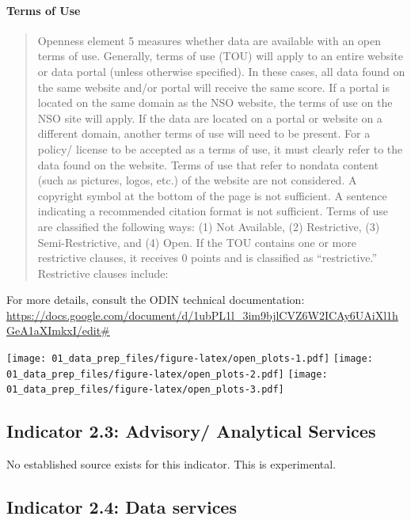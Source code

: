 \documentclass[]{article}
\let\oldparagraph\paragraph
\renewcommand{\paragraph}[1]{\oldparagraph{#1}\mbox{}}
\begin{document}
\hypertarget{terms-of-use}{%
\paragraph{Terms of Use}\label{terms-of-use}}

\begin{quote}
Openness element 5 measures whether data are available with an open
terms of use. Generally, terms of use (TOU) will apply to an entire
website or data portal (unless otherwise specified). In these cases, all
data found on the same website and/or portal will receive the same
score. If a portal is located on the same domain as the NSO website, the
terms of use on the NSO site will apply. If the data are located on a
portal or website on a different domain, another terms of use will need
to be present. For a policy/ license to be accepted as a terms of use,
it must clearly refer to the data found on the website. Terms of use
that refer to nondata content (such as pictures, logos, etc.) of the
website are not considered. A copyright symbol at the bottom of the page
is not sufficient. A sentence indicating a recommended citation format
is not sufficient. Terms of use are classified the following ways: (1)
Not Available, (2) Restrictive, (3) Semi-Restrictive, and (4) Open. If
the TOU contains one or more restrictive clauses, it receives 0 points
and is classified as ``restrictive.'' Restrictive clauses include:
\end{quote}

For more details, consult the ODIN technical documentation:
\url{https://docs.google.com/document/d/1ubPL1l_3im9bjlCVZ6W2ICAy6UAiXl1hGeA1aXImkxI/edit\#}

\texttt{[image: 01\_data\_prep\_files/figure-latex/open\_plots-1.pdf]}
\texttt{[image: 01\_data\_prep\_files/figure-latex/open\_plots-2.pdf]}
\texttt{[image: 01\_data\_prep\_files/figure-latex/open\_plots-3.pdf]}

\hypertarget{indicator-2.3-advisory-analytical-services}{%
\subsection{Indicator 2.3: Advisory/ Analytical
Services}\label{indicator-2.3-advisory-analytical-services}}

No established source exists for this indicator. This is experimental.

\hypertarget{indicator-2.4-data-services}{%
\subsection{Indicator 2.4: Data
services}\label{indicator-2.4-data-services}}
\end{document}
